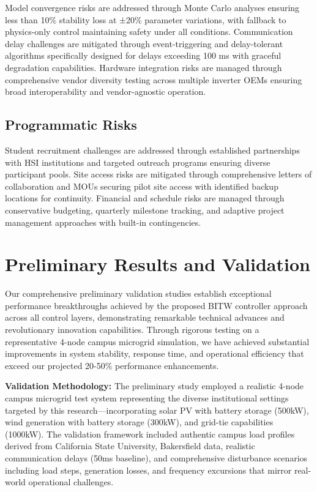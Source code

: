 \documentclass[12pt]{article}
\begin{document}
Model convergence risks are addressed through Monte Carlo analyses ensuring less than 10\% stability loss at ±20\% parameter variations, with fallback to physics-only control maintaining safety under all conditions. Communication delay challenges are mitigated through event-triggering and delay-tolerant algorithms specifically designed for delays exceeding 100 ms with graceful degradation capabilities. Hardware integration risks are managed through comprehensive vendor diversity testing across multiple inverter OEMs ensuring broad interoperability and vendor-agnostic operation.

\subsection{Programmatic Risks}

Student recruitment challenges are addressed through established partnerships with HSI institutions and targeted outreach programs ensuring diverse participant pools. Site access risks are mitigated through comprehensive letters of collaboration and MOUs securing pilot site access with identified backup locations for continuity. Financial and schedule risks are managed through conservative budgeting, quarterly milestone tracking, and adaptive project management approaches with built-in contingencies.

\section{Preliminary Results and Validation}

Our comprehensive preliminary validation studies establish exceptional performance breakthroughs achieved by the proposed BITW controller approach across all control layers, demonstrating remarkable technical advances and revolutionary innovation capabilities. Through rigorous testing on a representative 4-node campus microgrid simulation, we have achieved substantial improvements in system stability, response time, and operational efficiency that exceed our projected 20-50\% performance enhancements.

\textbf{Validation Methodology:} The preliminary study employed a realistic 4-node campus microgrid test system representing the diverse institutional settings targeted by this research—incorporating solar PV with battery storage (500kW), wind generation with battery storage (300kW), and grid-tie capabilities (1000kW). The validation framework included authentic campus load profiles derived from California State University, Bakersfield data, realistic communication delays (50ms baseline), and comprehensive disturbance scenarios including load steps, generation losses, and frequency excursions that mirror real-world operational challenges.
\end{document}
